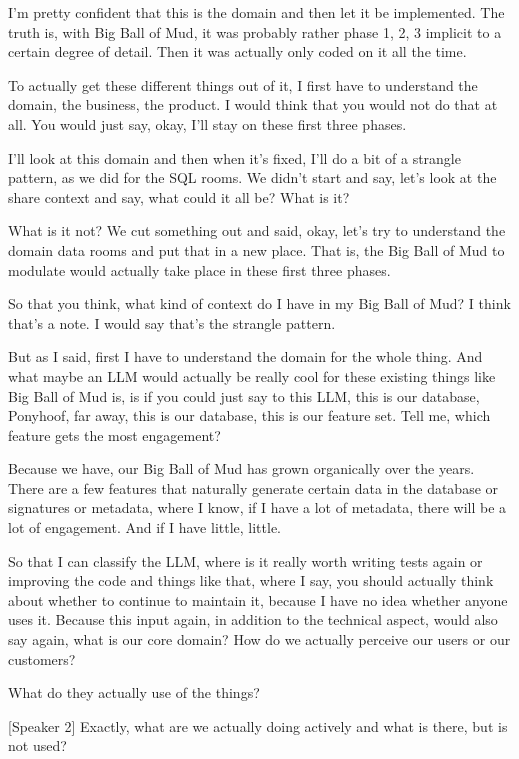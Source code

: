 I'm pretty confident that this is the domain and then let it be implemented. The truth is, with Big Ball of Mud, it was probably rather phase 1, 2, 3 implicit to a certain degree of detail. Then it was actually only coded on it all the time.

To actually get these different things out of it, I first have to understand the domain, the business, the product. I would think that you would not do that at all. You would just say, okay, I'll stay on these first three phases.

I'll look at this domain and then when it's fixed, I'll do a bit of a strangle pattern, as we did for the SQL rooms. We didn't start and say, let's look at the share context and say, what could it all be? What is it?

What is it not? We cut something out and said, okay, let's try to understand the domain data rooms and put that in a new place. That is, the Big Ball of Mud to modulate would actually take place in these first three phases.

So that you think, what kind of context do I have in my Big Ball of Mud? I think that's a note. I would say that's the strangle pattern.

But as I said, first I have to understand the domain for the whole thing. And what maybe an LLM would actually be really cool for these existing things like Big Ball of Mud is, is if you could just say to this LLM, this is our database, Ponyhoof, far away, this is our database, this is our feature set. Tell me, which feature gets the most engagement?

Because we have, our Big Ball of Mud has grown organically over the years. There are a few features that naturally generate certain data in the database or signatures or metadata, where I know, if I have a lot of metadata, there will be a lot of engagement. And if I have little, little.

So that I can classify the LLM, where is it really worth writing tests again or improving the code and things like that, where I say, you should actually think about whether to continue to maintain it, because I have no idea whether anyone uses it. Because this input again, in addition to the technical aspect, would also say again, what is our core domain? How do we actually perceive our users or our customers?

What do they actually use of the things?

[Speaker 2]
Exactly, what are we actually doing actively and what is there, but is not used?

